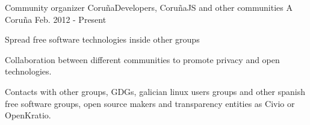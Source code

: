 \begin{cventries}
\cventry
{Community organizer} %
{CoruñaDevelopers, CoruñaJS and other communities}  
{A Coruña} %
{Feb. 2012 - Present} %
{ %
\begin{cvitems}
\item {Spread free software technologies inside other groups}
\item {Collaboration between different communities to promote privacy and open technologies.}
\item {Contacts with other groups, GDGs, galician linux users groups and other 
spanish free software groups, open source makers and transparency entities as Civio or OpenKratio.}
\end{cvitems}
}


\end{cventries}
